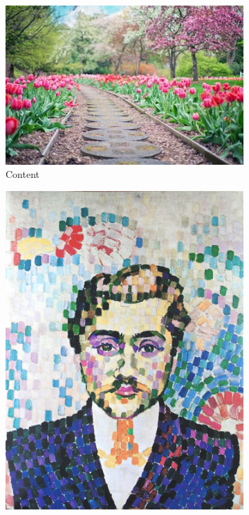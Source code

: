\documentclass[10pt,twocolumn,letterpaper]{article}
\begin{document}
\begin{figure}[ht]
\centering
\begin{subfigure}[b]{0.39\linewidth}
  \centering
  \includegraphics[width=\linewidth]{imgs/flowers.jpg}
  \caption{Content}
\end{subfigure}
\begin{subfigure}[b]{0.195\linewidth}
  \centering
  \includegraphics[width=\linewidth]{imgs/delaunay.jpg}

\end{subfigure}
\end{figure}
\end{document}
